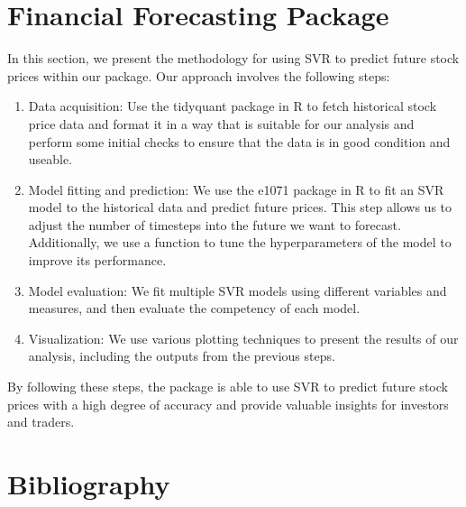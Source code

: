 \documentclass[11pt]{article}
\theoremstyle{definition}
\begin{document}
\section{Financial Forecasting Package}
In this section, we present the methodology for using SVR to predict future stock prices within our package. Our approach involves the following steps:
\begin{enumerate}
  \item Data acquisition: Use the tidyquant package in R to fetch historical stock price data and format it in a way that is suitable for our analysis and perform some initial checks to ensure that the data is in good condition and useable. 
  \item Model fitting and prediction: We use the e1071 package in R to fit an SVR model to the historical data and predict future prices. This step allows us to adjust the number of timesteps into the future we want to forecast. Additionally, we use a function to tune the hyperparameters of the model to improve its performance.
  \item Model evaluation: We fit multiple SVR models using different variables and measures, and then evaluate the competency of each model.
  \item Visualization: We use various plotting techniques to present the results of our analysis, including the outputs from the previous steps.
\end{enumerate}

By following these steps, the package is able to use SVR to predict future stock prices with a high degree of accuracy and provide valuable insights for investors and traders.

\newpage


\section{Bibliography}
\printbibliography
\end{document}
